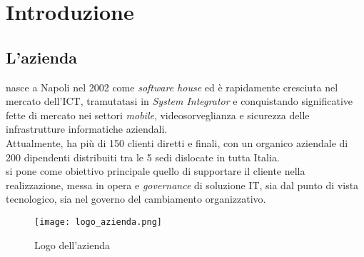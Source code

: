 
\chapter{Introduzione}
\label{cap:introduzione}

\section{L'azienda}

\myCompany\xspace nasce a Napoli nel 2002 come \textit{software house} ed è
rapidamente cresciuta nel
mercato dell'\gls{ICT}, tramutatasi in \textit{System Integrator} e
conquistando significative fette di mercato nei settori
\textit{mobile}, videosorveglianza e sicurezza delle infrastrutture
informatiche aziendali. \\
Attualmente, \myCompany ha più di 150 clienti diretti e finali, con un organico
aziendale
di 200 dipendenti distribuiti tra le 5 sedi dislocate in tutta Italia.\\
\myCompany\xspace si pone come obiettivo principale quello di supportare il
cliente nella realizzazione,
messa in opera e \textit{governance} di soluzione IT, sia dal punto di vista
tecnologico,
sia nel governo del cambiamento organizzativo.
\begin{figure}[!h]
      \centering
      \texttt{[image: logo\_azienda.png]}
      \caption{Logo dell'azienda}
\end{figure}

